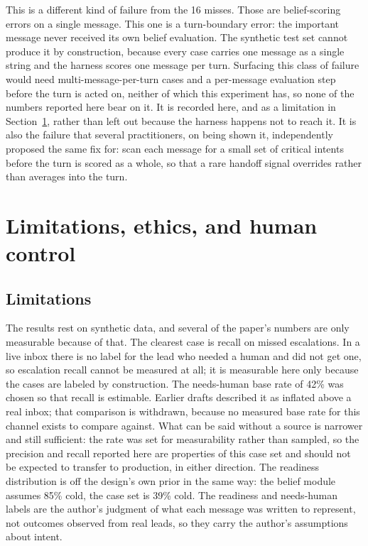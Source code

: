 \documentclass{article}
\begin{document}
This is a different kind of failure from the 16 misses. Those are belief-scoring
errors on a single message. This one is a turn-boundary error: the important
message never received its own belief evaluation. The synthetic test set cannot
produce it by construction, because every case carries one message as a single
string and the harness scores one message per turn. Surfacing this class of
failure would need multi-message-per-turn cases and a per-message evaluation step
before the turn is acted on, neither of which this experiment has, so none of the
numbers reported here bear on it. It is recorded here, and as a limitation in
Section~\ref{sec:limitations}, rather than left out because the harness happens
not to reach it. It is also the failure that several practitioners, on being shown
it, independently proposed the same fix for: scan each message for a small set of
critical intents before the turn is scored as a whole, so that a rare handoff
signal overrides rather than averages into the turn.
\section{Limitations, ethics, and human control}
\label{sec:limitations}

\subsection{Limitations}
The results rest on synthetic data, and several of the paper's numbers are only
measurable because of that. The clearest case is recall on missed escalations. In
a live inbox there is no label for the lead who needed a human and did not get
one, so escalation recall cannot be measured at all; it is measurable here only
because the cases are labeled by construction. The needs-human base rate of 42\%
was chosen so that recall is estimable. Earlier drafts described it as inflated
above a real inbox; that comparison is withdrawn, because no measured base rate for
this channel exists to compare against. What can be said without a source is
narrower and still sufficient: the rate was set for measurability rather than
sampled, so the precision and recall reported here are properties of this case set
and should not be expected to transfer to production, in either direction. The
readiness distribution is off the design's own prior in the same way: the belief
module assumes 85\% cold, the case set is 39\% cold.
The readiness and needs-human labels are the author's
judgment of what each message was written to represent, not outcomes observed from
real leads, so they carry the author's assumptions about intent.
\end{document}
